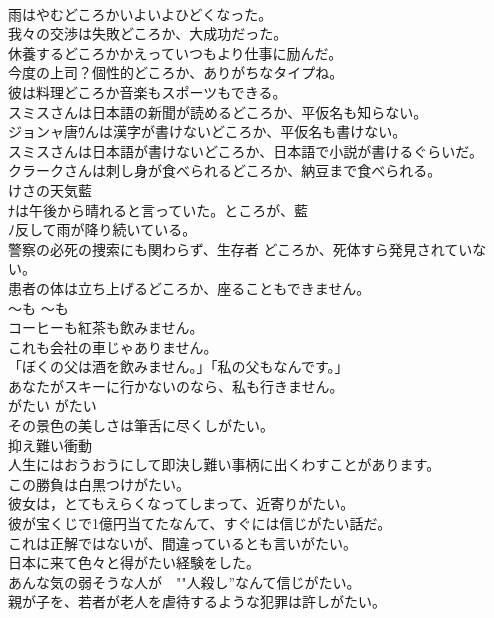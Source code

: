 \documentclass[8pt]{extreport}
\begin{document}
\begin{CJK}{UTF8}{min}
\\	雨はやむどころかいよいよひどくなった。   
\\	我々の交渉は失敗どころか、大成功だった。   
\\	休養するどころかかえっていつもより仕事に励んだ。   
\\	今度の上司？個性的どころか、ありがちなタイプね。   
\\	彼は料理どころか音楽もスポーツもできる。  
\\	スミスさんは日本語の新聞が読めるどころか、平仮名も知らない。   
\\	ジョンャ唐ｳんは漢字が書けないどころか、平仮名も書けない。   
\\	スミスさんは日本語が書けないどころか、日本語で小説が書けるぐらいだ。   
\\	クラークさんは刺し身が食べられるどころか、納豆まで食べられる。  
\\	けさの天気藍
\\	ﾅは午後から晴れると言っていた。ところが、藍
\\	ﾉ反して雨が降り続いている。  
\\	警察の必死の捜索にも関わらず、生存者 どころか、死体すら発見されていない。  
\\	患者の体は立ち上げるどころか、座ることもできません。  
\\	〜も	〜も	
\\	コーヒーも紅茶も飲みません。
\\	これも会社の車じゃありません。
\\	「ぼくの父は酒を飲みません。」「私の父もなんです。」  
\\	あなたがスキーに行かないのなら、私も行きません。  
\\	がたい	がたい	
\\	その景色の美しさは筆舌に尽くしがたい。  
\\	抑え難い衝動  
\\	人生にはおうおうにして即決し難い事柄に出くわすことがあります。  
\\	この勝負は白黒つけがたい。   
\\	彼女は，とてもえらくなってしまって、近寄りがたい。   
\\	彼が宝くじで1億円当てたなんて、すぐには信じがたい話だ。  
\\	これは正解ではないが、間違っているとも言いがたい。   
\\	日本に来て色々と得がたい経験をした。   
\\	あんな気の弱そうな人が　""人殺し”なんて信じがたい。   
\\	親が子を、若者が老人を虐待するような犯罪は許しがたい。  

\end{CJK}
\end{document}
